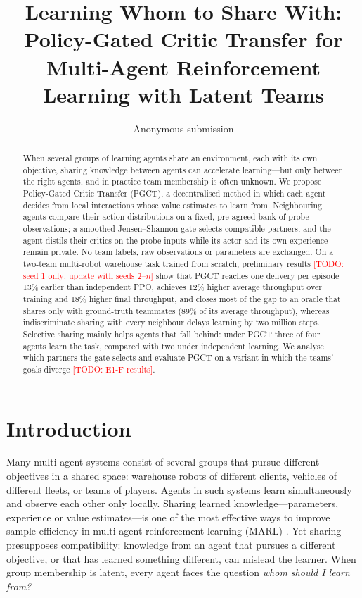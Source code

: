 \documentclass{article}
\title{Learning Whom to Share With:\\ Policy-Gated Critic Transfer for Multi-Agent Reinforcement Learning with Latent Teams}
\author{Anonymous submission}
\newcommand{\todo}[1]{\textcolor{red}{[TODO: #1]}}
\newcommand{\ours}{PGCT}
\begin{document}
\maketitle

\begin{abstract}
When several groups of learning agents share an environment, each with its own objective, sharing knowledge
between agents can accelerate learning---but only between the right agents, and in practice team membership
is often unknown. We propose Policy-Gated Critic Transfer (\ours{}), a decentralised method in which each agent
decides from local interactions whose value estimates to learn from. Neighbouring agents compare their action
distributions on a fixed, pre-agreed bank of probe observations; a smoothed Jensen--Shannon gate selects
compatible partners, and the agent distils their critics on the probe inputs while its actor and its own
experience remain private. No team labels, raw observations or parameters are exchanged. On a two-team
multi-robot warehouse task trained from scratch, preliminary results \todo{seed 1 only; update with seeds 2--$n$}
show that \ours{} reaches one delivery per episode 13\% earlier than independent PPO, achieves 12\% higher
average throughput over training and 18\% higher final throughput, and closes most of the gap to an oracle that
shares only with ground-truth teammates (89\% of its average throughput), whereas indiscriminate sharing with
every neighbour delays learning by two million steps. Selective sharing mainly helps agents that fall behind:
under \ours{} three of four agents learn the task, compared with two under independent learning. We analyse
which partners the gate selects and evaluate \ours{} on a variant in which the teams' goals diverge
\todo{E1-F results}.
\end{abstract}

\section{Introduction}
Many multi-agent systems consist of several groups that pursue different objectives in a shared space:
warehouse robots of different clients, vehicles of different fleets, or teams of players. Agents in such
systems learn simultaneously and observe each other only locally. Sharing learned knowledge---parameters,
experience or value estimates---is one of the most effective ways to improve sample efficiency in multi-agent
reinforcement learning (MARL) \cite{christianos2020seac,christianos2021seps}. Yet sharing presupposes
compatibility: knowledge from an agent that pursues a different objective, or that has learned something
different, can mislead the learner. When group membership is latent, every agent faces the question
\emph{whom should I learn from?}
\end{document}
